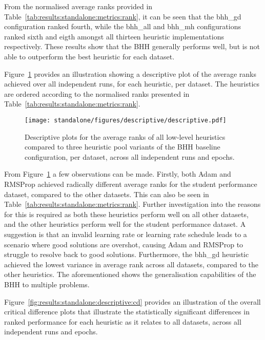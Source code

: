 From the normalised average ranks provided in Table~\ref{tab:results:standalone:metrics:rank}, it can be seen that the bhh\_gd configuration ranked fourth, while the bhh\_all and bhh\_mh configurations ranked sixth and eigth amongst all thirteen heuristic implementations respectively. These results show that the \acs{BHH} generally performs well, but is not able to outperform the best heuristic for each dataset.

Figure~\ref{fig:results:standalone:descriptive:descriptive} provides an illustration showing a descriptive plot of the average ranks achieved over all independent runs, for each heuristic, per dataset. The heuristics are ordered according to the normalised ranks presented in Table~\ref{tab:results:standalone:metrics:rank}.

\begin{figure}[htb]
      \centering
      \texttt{[image: standalone/figures/descriptive/descriptive.pdf]}
      \caption{Descriptive plots for the average ranks of all low-level heuristics compared to three heuristic pool variants of the \acs{BHH} baseline configuration, per dataset, across all independent runs and epochs.}
      \label{fig:results:standalone:descriptive:descriptive}
\end{figure}

From Figure~\ref{fig:results:standalone:descriptive:descriptive} a few observations can be made. Firstly, both \acs{Adam} and \acs{RMSProp} achieved radically different average ranks for the student performance dataset, compared to the other datasets. This can also be seen in Table~\ref{tab:results:standalone:metrics:rank}. Further investigation into the reasons for this is required as both these heuristics perform well on all other datasets, and the other heuristics perform well for the student performance dataset. A suggestion is that an invalid learning rate or learning rate schedule leads to a scenario where good solutions are overshot, causing \acs{Adam} and \acs{RMSProp} to struggle to resolve back to good solutions. Furthermore, the bhh\_gd heuristic achieved the lowest variance in average rank across all datasets, compared to the other heuristics. The aforementioned shows the generalisation capabilities of the \acs{BHH} to multiple problems.

Figure~\ref{fig:results:standalone:descriptive:cd} provides an illustration of the overall critical difference plots that illustrate the statistically significant differences in ranked performance for each heuristic as it relates to all datasets, across all independent runs and epochs.

